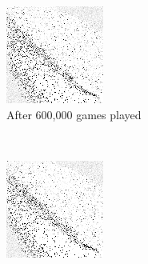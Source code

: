 \begin{figure}
	\begin{subfigure}[t]{0.2\textwidth}
	\includegraphics[width=\textwidth]{images/findings/round1/flipbook_d.png}
	\caption{After 600,000 games played}
	\end{subfigure}
	~
	\begin{subfigure}[t]{0.2\textwidth}
	\includegraphics[width=\textwidth]{images/findings/round1/flipbook_e.png}

\end{subfigure}
\end{figure}
